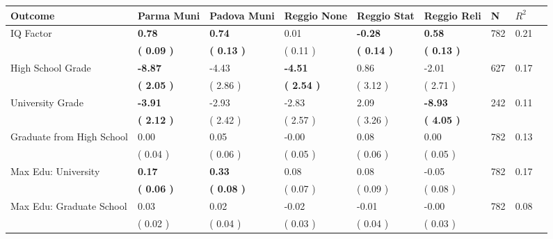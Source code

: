 \begin{tabular}{L{6.2cm} C{1.8cm} C{1.8cm} C{1.8cm} C{1.8cm} C{1.8cm} C{1.8cm} C{0.3cm} C{0.3cm}}
\toprule
 \textbf{Outcome} & \textbf{Parma Muni} & \textbf{Padova Muni} & \textbf{Reggio None} & \textbf{Reggio Stat} & \textbf{Reggio Reli} & \textbf{N} & \textbf{$ R^2$} \\
\midrule
IQ Factor & \textbf{     0.78} & \textbf{     0.74} &      0.01 & \textbf{    -0.28} & \textbf{     0.58}  & 782 &       0.21 \\ 
 & \textbf{(     0.09 )} & \textbf{(     0.13 )} & (     0.11 ) & \textbf{(     0.14 )} & \textbf{(     0.13 )}  & \\
High School Grade & \textbf{    -8.87} &     -4.43 & \textbf{    -4.51} &      0.86 &     -2.01  & 627 &       0.17 \\ 
 & \textbf{(     2.05 )} & (     2.86 ) & \textbf{(     2.54 )} & (     3.12 ) & (     2.71 )  & \\
University Grade & \textbf{    -3.91} &     -2.93 &     -2.83 &      2.09 & \textbf{    -8.93}  & 242 &       0.11 \\ 
 & \textbf{(     2.12 )} & (     2.42 ) & (     2.57 ) & (     3.26 ) & \textbf{(     4.05 )}  & \\
Graduate from High School &      0.00 &      0.05 &     -0.00 &      0.08 &      0.00  & 782 &       0.13 \\ 
 & (     0.04 ) & (     0.06 ) & (     0.05 ) & (     0.06 ) & (     0.05 )  & \\
Max Edu: University & \textbf{     0.17} & \textbf{     0.33} &      0.08 &      0.08 &     -0.05  & 782 &       0.17 \\ 
 & \textbf{(     0.06 )} & \textbf{(     0.08 )} & (     0.07 ) & (     0.09 ) & (     0.08 )  & \\
Max Edu: Graduate School &      0.03 &      0.02 &     -0.02 &     -0.01 &     -0.00  & 782 &       0.08 \\ 
 & (     0.02 ) & (     0.04 ) & (     0.03 ) & (     0.04 ) & (     0.03 )  & \\
\bottomrule
\end{tabular}
